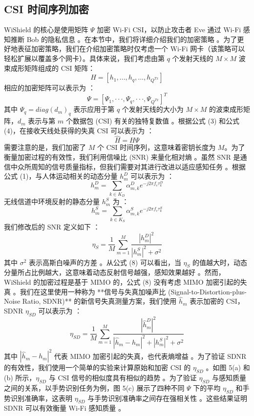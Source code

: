 \documentclass[journal]{IEEEtran}
\begin{document}
\subsection{CSI 时间序列加密}
WiShield 的核心是使用矩阵 $\Psi$ 加密 Wi-Fi CSI，以防止攻击者 Eve 通过 Wi-Fi 感知推断 Bob 的隐私信息 。在本节中，我们将详细介绍我们的加密策略 。为了更好地表征加密策略，我们在介绍加密策略时仅考虑一个 Wi-Fi 网卡（该策略可以轻松扩展以覆盖多个网卡）。具体来说，我们考虑由第 $q$ 个发射天线的 $M \times M$ 波束成形矩阵组成的 CSI 矩阵：
\begin{equation}
H=[h_{1},...,h_{q},...,h_{Q^{Tx}}]
\end{equation}
相应的加密矩阵可以表示为 ：
\begin{equation}
\Psi=[\Psi_{1},\cdot\cdot\cdot,\Psi_{q},\cdot\cdot\cdot,\Psi_{Q^{Tx}}]^{T}
\end{equation}
其中 $\Psi_{q}=diag(d_{m})_{q}$ 表示应用于第 $q$ 个发射天线的大小为 $M \times M$ 的波束成形矩阵，$d_{m}$ 表示与第 $m$ 个数据包 (CSI) 有关的独特复数值 。根据公式 (3) 和公式 (4)，在接收天线处获得的失真 CSI 可以表示为 ：
\begin{equation}
\hat{H}=H\Psi
\end{equation}
需要注意的是，我们加密了 $M$ 个 CSI 时间序列，这意味着密钥长度为 $M$。为了衡量加密过程的有效性，我们利用信噪比 (SNR) 来量化相对熵 。虽然 SNR 是通信中众所周知的信号质量指标，但我们需要对其进行改进以适应感知任务 。根据公式 (1)，与人体运动相关的动态分量 $h_{m}^{D}$ 可以表示为 ：
\begin{equation}
h_{m}^{D}=\sum_{k\in K_{D}}\alpha_{m,k}^{D}e^{-j2\pi f_{c}\tau_{k}^{D}}
\end{equation}
无线信道中环境反射的静态分量 $h_{m}^{S}$ 为 ：
\begin{equation}
h_{m}^{S}=\sum_{k\in K_{S}}\alpha_{m,k}^{S}e^{-j2\pi f_{c}\tau_{k}^{S}}
\end{equation}
我们修改后的 SNR 定义如下 ：
\begin{equation}
\eta_{S}=\frac{1}{M}\sum_{m=1}^{M}\frac{|h_{m}^{D}|^{2}}{|h_{m}^{S}|^{2}+\sigma^{2}}
\end{equation}
其中 $\sigma^{2}$ 表示高斯白噪声的方差 。从公式 (8) 可以看出，当 $\eta_{S}$ 的值越大时，动态分量所占比例越大，这意味着动态反射信号越强，感知效果越好 。然而，WiShield 的加密过程是基于 MIMO 的，公式 (8) 没有考虑 MIMO 加密引起的失真 。我们在这里使用一种称为 **信号与失真加噪声比 (Signal-to-Distortion-plus-Noise Ratio, SDNR)** 的新信号失真测量方案，我们使用 $\hat{h}_{m}$ 表示加密的 CSI，SDNR $\eta_{SD}$ 可以表示为 ：
\begin{equation}
\eta_{SD}=\frac{1}{M}\sum_{m=1}^{M}\frac{|\hat{h}_{m}^{D}|^{2}}{|\hat{h}_{m}-h_{m}|^{2}+|h_{m}^{S}|^{2}+\sigma^{2}}
\end{equation}
其中 $|\hat{h}_{m}-h_{m}|^{2}$ 代表 MIMO 加密引起的失真，也代表熵增益 。为了验证 SDNR 的有效性，我们使用一个简单的实验来计算原始和加密 CSI 的 $\eta_{SD}$ 。如图 5(a) 和 (b) 所示，$\eta_{SD}$ 与 CSI 信号的相似度具有相似的趋势 。为了验证 $\eta_{SD}$ 与感知质量之间的关系，以手势识别任务为例，图 5(c) 展示了四种不同 $\Psi$ 下的平均 $\eta_{SD}$ 和手势识别准确率，这表明 $\eta_{SD}$ 与手势识别准确率之间存在强相关性 。这些结果证明 SDNR 可以有效衡量 Wi-Fi 感知质量 。
\end{document}
